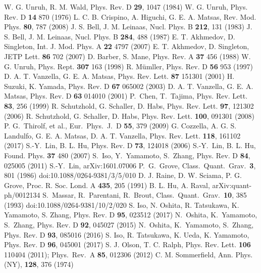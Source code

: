 \documentclass[aps,prd,preprintnumbers,nofootinbib,showpacs,11pt]{revtex4}%
\begin{document}
\begin{widetext}
\begin{thebibliography}{99}
W. G. Unruh, R. M. Wald, Phys. Rev. D {\bf 29}, 1047 (1984)
W. G. Unruh, Phys. Rev. D {\bf 14} 870 (1976)
L. C. B. Crispino, A. Higuchi, G. E. A. Matsas, Rev. Mod. Phys. {\bf 80}, 787 (2008)
J. S. Bell, J. M. Leinaas, Nucl. Phys. B {\bf 212}, 131 (1983)
J. S. Bell, J. M. Leinaas, Nucl. Phys. B {\bf 284}, 488 (1987)
E. T. Akhmedov, D. Singleton, Int. J. Mod. Phys. A {\bf 22} 4797 (2007)
E. T. Akhmedov, D. Singleton, JETP Lett. {\bf 86} 702 (2007)
D. Barber, S. Mane, Phys. Rev. A {\bf 37} 456 (1988)
W. G. Unruh, Phys. Rept. {\bf 307} 163 (1998)
R. M\"umller, Phys. Rev. D {\bf 56} 953 (1997)
D. A. T. Vanzella, G. E. A. Matsas, Phys. Rev. Lett. {\bf 87} 151301 (2001)
 H. Suzuki, K. Yamada, Phys. Rev. D {\bf 67} 065002 (2003)
D. A. T. Vanzella, G. E. A. Matsas, Phys. Rev. D {\bf 63} 014010 (2001)
  P.~Chen, T.~Tajima,
  Phys. Rev. Lett. {\bf 83}, 256 (1999) 
R. Schutzhold, G. Schaller, D. Habs, Phys. Rev. Lett. {\bf 97}, 121302 (2006)
R. Schutzhold, G. Schaller, D. Habs, Phys. Rev. Lett. {\bf 100}, 091301 (2008)
  P. G.~Thirolf, et al., 
  Eur.\ Phys.\ J.\ D {\bf 55}, 379 (2009)
G. Cozzella, A. G. S. Landulfo, G. E. A. Matsas, D. A. T. Vanzella, 
Phys. Rev. Lett. {\bf 118}, 161102 (2017)
S.-Y.~Lin, B. L. Hu, Phys. Rev. D {\bf73}, 124018 (2006)
S.-Y.~Lin, B. L. Hu, Found. Phys. {\bf 37} 480 (2007)
 S.~Iso, Y.~Yamamoto, S.~Zhang, Phys. Rev. D {\bf 84}, 025005 (2011)
S.-Y.~Lin, arXiv:1601.07006
 P.~G.~Grove,
  Class.\ Quant.\ Grav.\  {\bf 3}, 801 (1986)
  doi:10.1088/0264-9381/3/5/010
 D. J. Raine, D. W. Sciama, P. G. Grove, Proc. R. Soc. Lond. A {\bf 435}, 205 (1991)
  B. L. Hu, A. Raval, arXiv:quant-ph/0012134
 S.~Massar, R.~Parentani, R.~Brout,
  Class.\ Quant.\ Grav.\  {\bf 10}, 385 (1993)
  doi:10.1088/0264-9381/10/2/020
S. Iso, N. Oshita, R. Tatsukawa, K. Yamamoto, S. Zhang, Phys. Rev. D {\bf 95}, 023512 (2017) 
 N.~Oshita, K.~Yamamoto, S.~Zhang, Phys. Rev. D {\bf 92}, 045027 (2015)
 N.~Oshita, K.~Yamamoto, S.~Zhang, Phys. Rev. D {\bf 93}, 085016 (2016) 
S. Iso, R. Tatsukawa, K. Ueda, K. Yamamoto, Phys. Rev. D {\bf 96}, 045001 (2017)
S. J. Olson, T. C. Ralph, Phys. Rev. Lett. {\bf 106} 110404 (2011); Phys.\ Rev.\ A {\bf 85}, 012306 (2012)
C. M. Sommerfield, Ann. Phys. (NY), {\bf 128}, 376 (1974)


\end{thebibliography}
\end{widetext}
\end{document}
